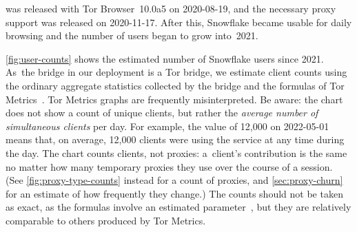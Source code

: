 \documentclass[letterpaper,twocolumn]{article}
\begin{document}
was released with Tor Browser~10.0a5 on \mbox{2020-08-19},
and the necessary proxy support was released on \mbox{2020-11-17}.
After this, Snowflake became usable for daily browsing
and the number of users began to grow into~2021.

\autoref{fig:user-counts}
shows the estimated number of Snowflake users since 2021.
As~the bridge in our deployment is a Tor bridge,
we estimate client counts using the ordinary aggregate statistics
collected by the bridge
and the formulas of Tor Metrics~\cite{tor-tr-2012-10-001}.
Tor Metrics graphs are frequently misinterpreted.
Be aware: the chart does not show a count of unique clients,
but rather the \emph{average number of simultaneous clients} per day.
For example, the value of 12,000 on \mbox{2022-05-01}
means that, on average, 12,000 clients were using the service
at any time during the day.
The chart counts clients, not proxies:
a~client's contribution is the same no matter how many
temporary proxies they use over the course of a session.
(See \autoref{fig:proxy-type-counts} instead for a count of proxies,
and \autoref{sec:proxy-churn} for an estimate of how frequently they change.)
The counts should not be taken as exact,
as the formulas involve an estimated parameter~\cite[\S 4]{tor-tr-2012-10-001},
but they are relatively comparable to others
produced by Tor Metrics.
\end{document}
